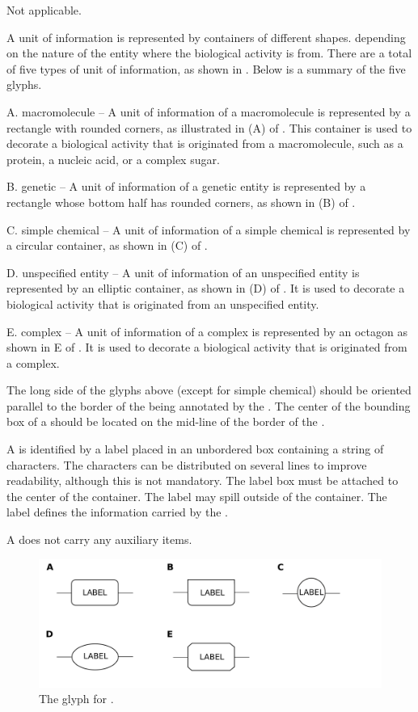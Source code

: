 \begin{glyphDescription}

\glyphSboTerm Not applicable.

\glyphContainer A unit of information is represented by containers of different shapes. depending on the nature of the entity where the biological activity is from.  There are a total of five types of unit of information, as shown in .   Below is a summary of the five glyphs.


A. macromolecule -- A unit of information of a macromolecule is represented by a rectangle with rounded corners, as illustrated in (A) of .  This container is used to decorate a biological activity that is originated from a macromolecule, such as a protein, a nucleic acid, or a complex sugar.

B. genetic -- A unit of information of a genetic entity is represented by a rectangle whose bottom half has rounded corners, as shown in (B) of  .

C. simple chemical -- A unit of information of a simple chemical is represented by a circular container, as shown in (C) of .  

D. unspecified entity -- A unit of information of an unspecified entity is represented by an elliptic container, as shown in (D) of .  It is used to decorate a biological activity that is originated from an unspecified entity.

E. complex -- A unit of information of a complex is represented by an octagon as shown in E of .  It is used to decorate a biological activity that is originated from a complex.

The long side of the glyphs above (except for simple chemical) should be oriented parallel to the border of the  being annotated by the . The center of the bounding box of a  should be located on the mid-line of the border of the .

\glyphLabel A  is identified by a label placed in an unbordered box containing a string of characters.  The characters can be distributed on several lines to improve readability, although this is not mandatory.  The label box must be attached to the center of the container.  The label may spill outside of the container.  The label defines the information carried by the .  


\glyphAux A  does not carry any auxiliary items.

\end{glyphDescription}

\begin{figure}[H]
  \centering
  \includegraphics[scale = 0.2]{images/unitInformation}
  \caption{The \AF glyph for .}
  \label{fig:af:unitInfo}
\end{figure}